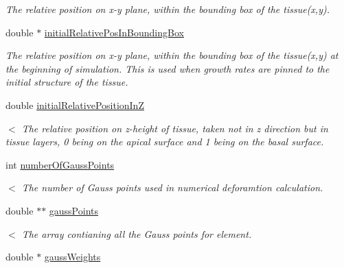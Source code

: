 \begin{DoxyCompactItemize}
\begin{DoxyCompactList}\small\item\em The relative position on x-\/y plane, within the bounding box of the tissue(x,y). \end{DoxyCompactList}\item 
\hypertarget{classShapeBase_a8825955bac10c5deabb9c02cd27577e9}{}double $\ast$ \hyperlink{classShapeBase_a8825955bac10c5deabb9c02cd27577e9}{initial\+Relative\+Pos\+In\+Bounding\+Box}\label{classShapeBase_a8825955bac10c5deabb9c02cd27577e9}

\begin{DoxyCompactList}\small\item\em The relative position on x-\/y plane, within the bounding box of the tissue(x,y) at the beginning of simulation. This is used when growth rates are pinned to the initial structure of the tissue. \end{DoxyCompactList}\item 
\hypertarget{classShapeBase_ab6847e4087010221acd07ad298c5c0bd}{}double \hyperlink{classShapeBase_ab6847e4087010221acd07ad298c5c0bd}{initial\+Relative\+Position\+In\+Z}\label{classShapeBase_ab6847e4087010221acd07ad298c5c0bd}

\begin{DoxyCompactList}\small\item\em $<$ The relative position on z-\/height of tissue, taken not in z direction but in tissue layers, 0 being on the apical surface and 1 being on the basal surface. \end{DoxyCompactList}\item 
\hypertarget{classShapeBase_ac6da2160db5df6b777f377c5969491f0}{}int \hyperlink{classShapeBase_ac6da2160db5df6b777f377c5969491f0}{number\+Of\+Gauss\+Points}\label{classShapeBase_ac6da2160db5df6b777f377c5969491f0}

\begin{DoxyCompactList}\small\item\em $<$ The number of Gauss points used in numerical deforamtion calculation. \end{DoxyCompactList}\item 
\hypertarget{classShapeBase_a76ef38f3112b904a906fb8228b5ae53b}{}double $\ast$$\ast$ \hyperlink{classShapeBase_a76ef38f3112b904a906fb8228b5ae53b}{gauss\+Points}\label{classShapeBase_a76ef38f3112b904a906fb8228b5ae53b}

\begin{DoxyCompactList}\small\item\em $<$ The array contianing all the Gauss points for element. \end{DoxyCompactList}\item 
\hypertarget{classShapeBase_aa0ec234a2a9235f72135ad0fbd456bd1}{}double $\ast$ \hyperlink{classShapeBase_aa0ec234a2a9235f72135ad0fbd456bd1}{gauss\+Weights}\label{classShapeBase_aa0ec234a2a9235f72135ad0fbd456bd1}


\end{DoxyCompactItemize}
